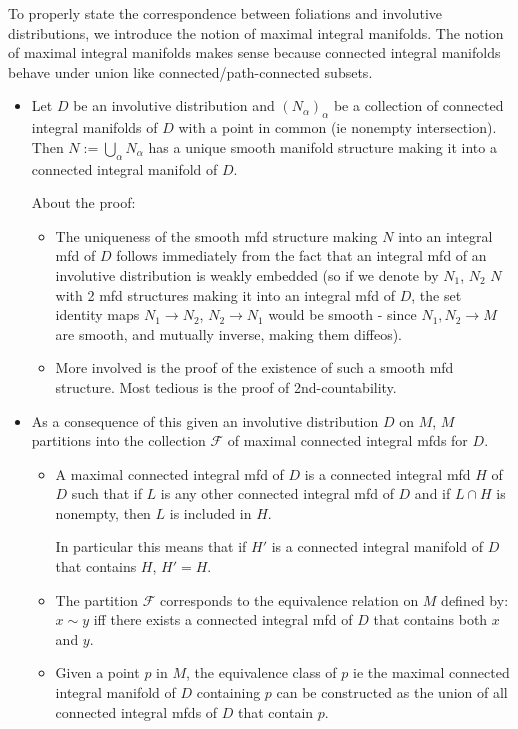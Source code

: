 \documentclass{report}
\theoremstyle{definition}
\begin{document}
To properly state the correspondence between foliations and involutive distributions, we introduce the notion of maximal integral manifolds. The notion of maximal integral manifolds makes sense because connected integral manifolds behave under union like connected/path-connected subsets.
\begin{itemize}
    \item Let $D$ be an involutive distribution and $(N_\alpha)_\alpha$ be a collection of connected integral manifolds of $D$ with a point in common (ie nonempty intersection). Then $N:=\bigcup_\alpha N_\alpha$ has a unique smooth manifold structure making it into a connected integral manifold of $D$.

    About the proof:
    \begin{itemize}
        \item The uniqueness of the smooth mfd structure making $N$ into an integral mfd of $D$ follows immediately from the fact that an integral mfd of an involutive distribution is weakly embedded (so if we denote by $N_1$, $N_2$ $N$ with 2 mfd structures making it into an integral mfd of $D$, the set identity maps $N_1\to N_2$, $N_2\to N_1$ would be smooth - since $N_1,N_2\to M$ are smooth, and mutually inverse, making them diffeos).

        \item More involved is the proof of the existence of such a smooth mfd structure. Most tedious is the proof of 2nd-countability.
    \end{itemize}
    \item As a consequence of this given an involutive distribution $D$ on $M$, $M$ partitions into the collection $\mathcal{F}$ of maximal connected integral mfds for $D$.
    \begin{itemize}
        \item A maximal connected integral mfd of $D$ is a connected integral mfd $H$ of $D$ such that if $L$ is any other connected integral mfd of $D$ and if $L\cap H$ is nonempty, then $L$ is included in $H$.

        In particular this means that if $H'$ is a connected integral manifold of $D$ that contains $H$, $H'=H$.
        \item The partition $\mathcal{F}$ corresponds to the equivalence relation on $M$ defined by: $x\sim y$ iff there exists a connected integral mfd of $D$ that contains both $x$ and $y$.
        \item Given a point $p$ in $M$, the equivalence class of $p$ ie the maximal connected integral manifold of $D$ containing $p$ can be constructed as the union of all connected integral mfds of $D$ that contain $p$.
    \end{itemize}
\end{itemize}
\end{document}
